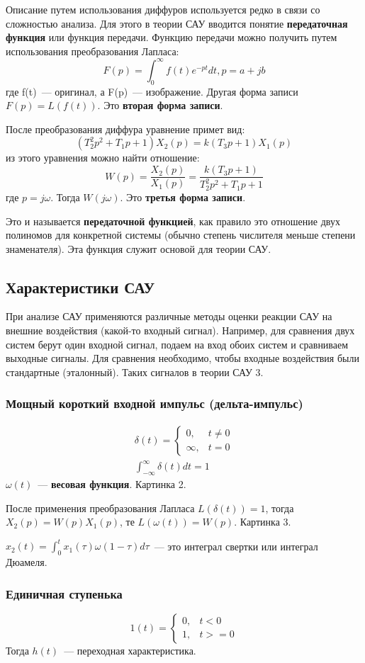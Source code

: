 Описание путем использования диффуров используется редко в связи со сложностью анализа. Для этого в теории САУ вводится понятие \textbf{передаточная функция} или функция передачи. Функцию передачи можно получить путем использования преобразования Лапласа:
	$$
	F(p)=\int_0^{\infty}f(t)e^{-pt}dt, p=a+jb
	$$
где f(t)~--- оригинал, а F(p)~--- изображение. Другая форма записи $F(p)=L(f(t))$. Это \textbf{вторая форма записи}.

После преобразования диффура уравнение примет вид:
	$$
	(T^2_2p^2+T_1p+1)X_2(p)=k(T_3p+1)X_1(p)
	$$
из этого уравнения можно найти отношение:
	$$
	W(p)=\frac{X_2(p)}{X_1(p)}=\frac{k(T_3p+1)}{T_2^2p^2+T_1p+1}
	$$
где $p=j\omega$. Тогда $W(j\omega)$. Это \textbf{третья форма записи}.

Это и называется \textbf{передаточной функцией}, как правило это отношение двух полиномов для конкретной системы (обычно степень числителя меньше степени знаменателя). Эта функция служит основой для теории САУ.

\subsection{Характеристики САУ}
При анализе САУ применяются различные методы оценки реакции САУ на внешние воздействия (какой-то входный сигнал). Например, для сравнения двух систем берут один входной сигнал, подаем на вход обоих систем и сравниваем выходные сигналы. Для сравнения необходимо, чтобы входные воздействия были стандартные (эталонный). Таких сигналов в теории САУ 3.
\subsubsection{Мощный короткий входной импульс (дельта-импульс)}
	\begin{gather*}
		\delta(t)=\left\{\begin{matrix}0, &t\neq0\\{}\infty, &t=0\end{matrix}\right.\\
		\int^{\infty}_{-\infty}\delta(t)dt=1
	\end{gather*}
	$\omega(t)$~--- \textbf{весовая функция}. Картинка 2.
	
	После применения преобразования Лапласа $L(\delta(t))=1$, тогда $X_2(p)=W(p)X_1(p)$, те $L(\omega(t))=W(p)$. Картинка 3.
	
	$x_2(t)=\int^t_0x_1(\tau)\omega(1-\tau)d\tau$~--- это интеграл свертки или интеграл Дюамеля.
	
\subsubsection{Единичная ступенька}
	$$1(t)=\left\{\begin{matrix}0, &t<0\\1, &t>=0\end{matrix}\right.$$
	Тогда $h(t)$~--- переходная характеристика.
	
